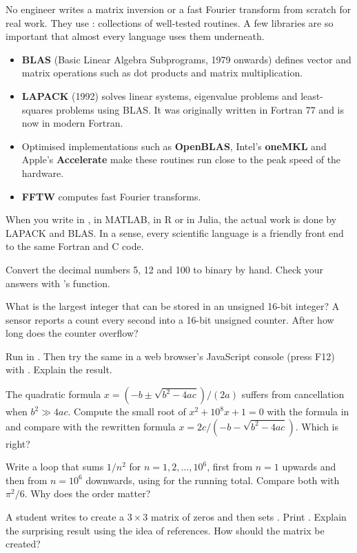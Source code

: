 No engineer writes a matrix inversion or a fast Fourier transform from scratch for real
work. They use : collections of well-tested routines. A few libraries are
so important that almost every language uses them underneath.
\begin{itemize}
\item \textbf{BLAS} (Basic Linear Algebra Subprograms, 1979 onwards) defines vector and
  matrix operations such as dot products and matrix multiplication.
\item \textbf{LAPACK} (1992) solves linear systems, eigenvalue problems and least-squares
  problems using BLAS. It was originally written in Fortran 77 and is now in modern
  Fortran.
\item Optimised implementations such as \textbf{OpenBLAS}, Intel's \textbf{oneMKL} and
  Apple's \textbf{Accelerate} make these routines run close to the peak speed of the
  hardware.
\item \textbf{FFTW} computes fast Fourier transforms.
\end{itemize}
When you write  in \py,  in MATLAB,
 in R or  in Julia, the actual work is done by
LAPACK and BLAS. In a sense, every scientific language is a friendly front end to the same
Fortran and C code.

\begin{exercises}
\item Convert the decimal numbers 5, 12 and 100 to binary by hand. Check your answers with
  \py's  function.
\item What is the largest integer that can be stored in an unsigned 16-bit integer? A
  sensor reports a count every second into a 16-bit unsigned counter. After how long does
  the counter overflow?
\item Run  in \py. Then try the same in a web browser's JavaScript
  console (press F12) with . Explain the result.
\item The quadratic formula $x = (-b \pm\sqrt{b^2-4ac})/(2a)$ suffers from cancellation when
  $b^2 \gg 4ac$. Compute the small root of $x^2 + 10^8 x + 1 = 0$ with the formula in \py
  and compare with the rewritten formula $x = 2c/(-b - \sqrt{b^2-4ac})$. Which is right?
\item Write a \py loop that sums $1/n^2$ for $n = 1, 2, \ldots, 10^6$, first from $n=1$
  upwards and then from $n=10^6$ downwards, using  for the running
  total. Compare both with $\pi^2/6$. Why does the order matter?
\item A \py student writes  to create a $3\times3$ matrix of zeros
  and then sets . Print . Explain the surprising result using the
  idea of references. How should the matrix be created?
\end{exercises}
